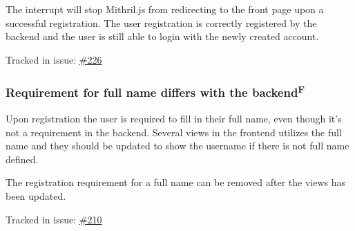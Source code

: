 \documentclass[12pt,a4paper]{report}
\begin{document}
The interrupt will stop Mithril.js from redirecting to the front page upon a successful registration. The user registration is correctly registered by the backend and the user is still able to login with the newly created account.

Tracked in issue: \href{https://github.com/LuleaUniversityOfTechnology/2018-project-roaster/issues/226}{\#226}

\subsubsection{Requirement for full name differs with the backend\texorpdfstring{\textsuperscript{F}}{}}
Upon registration the user is required to fill in their full name, even though it's not a requirement in the backend. Several views in the frontend utilizes the full name and they should be updated to show the username if there is not full name defined.

The registration requirement for a full name can be removed after the views has been updated.

Tracked in issue: \href{https://github.com/LuleaUniversityOfTechnology/2018-project-roaster/issues/210}{\#210}
\end{document}
